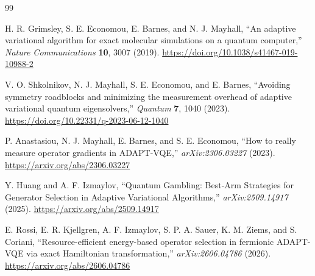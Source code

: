 \documentclass[11pt]{article}
\begin{document}
\begin{thebibliography}{99}

H. R. Grimsley, S. E. Economou, E. Barnes, and N. J. Mayhall,
``An adaptive variational algorithm for exact molecular simulations on a quantum computer,''
\emph{Nature Communications} \textbf{10}, 3007 (2019).
\url{https://doi.org/10.1038/s41467-019-10988-2}

V. O. Shkolnikov, N. J. Mayhall, S. E. Economou, and E. Barnes,
``Avoiding symmetry roadblocks and minimizing the measurement overhead of adaptive variational quantum eigensolvers,''
\emph{Quantum} \textbf{7}, 1040 (2023).
\url{https://doi.org/10.22331/q-2023-06-12-1040}

P. Anastasiou, N. J. Mayhall, E. Barnes, and S. E. Economou,
``How to really measure operator gradients in ADAPT-VQE,''
\emph{arXiv:2306.03227} (2023).
\url{https://arxiv.org/abs/2306.03227}

Y. Huang and A. F. Izmaylov,
``Quantum Gambling: Best-Arm Strategies for Generator Selection in Adaptive Variational Algorithms,''
\emph{arXiv:2509.14917} (2025).
\url{https://arxiv.org/abs/2509.14917}

E. Rossi, E. R. Kjellgren, A. F. Izmaylov, S. P. A. Sauer, K. M. Ziems, and S. Coriani,
``Resource-efficient energy-based operator selection in fermionic ADAPT-VQE via exact Hamiltonian transformation,''
\emph{arXiv:2606.04786} (2026).
\url{https://arxiv.org/abs/2606.04786}

\end{thebibliography}
\end{document}
